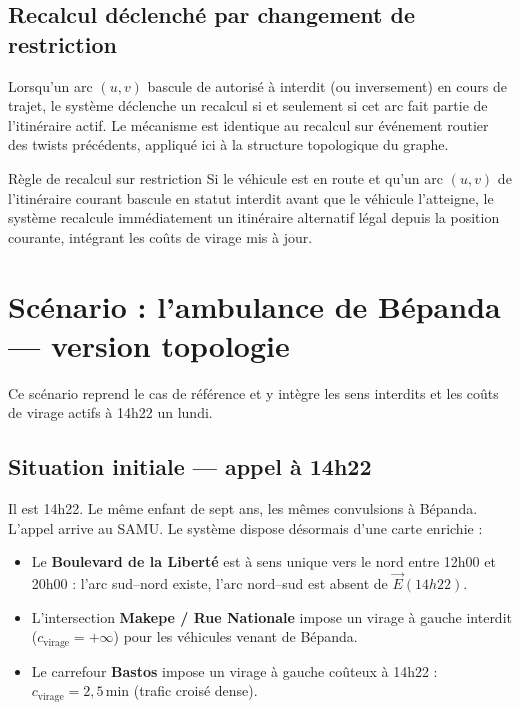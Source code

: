 \documentclass[12pt,a4paper]{article}
\theoremstyle{definition}
\theoremstyle{remark}
\begin{document}
\subsection{Recalcul déclenché par changement de restriction}

Lorsqu'un arc $(u, v)$ bascule de autorisé à interdit (ou inversement)
en cours de trajet, le système déclenche un recalcul si et seulement
si cet arc fait partie de l'itinéraire actif. Le mécanisme est identique
au recalcul sur événement routier des twists précédents, appliqué ici
à la structure topologique du graphe.

\begin{metierbox}{Règle de recalcul sur restriction}
Si le véhicule est en route et qu'un arc $(u, v)$ de l'itinéraire
courant bascule en statut interdit avant que le véhicule l'atteigne,
le système recalcule immédiatement un itinéraire alternatif légal
depuis la position courante, intégrant les coûts de virage mis à jour.
\end{metierbox}

\newpage

\section{Scénario : l'ambulance de Bépanda — version topologie}

Ce scénario reprend le cas de référence et y intègre les sens interdits
et les coûts de virage actifs à 14h22 un lundi.

\subsection{Situation initiale — appel à 14h22}

Il est 14h22. Le même enfant de sept ans, les mêmes convulsions à Bépanda.
L'appel arrive au SAMU. Le système dispose désormais d'une carte enrichie :

\begin{itemize}[leftmargin=2em, itemsep=4pt]
  \item Le \textbf{Boulevard de la Liberté} est à sens unique vers le
    nord entre 12h00 et 20h00 : l'arc sud–nord existe, l'arc
    nord–sud est absent de $\vec{E}(14h22)$.
  \item L'intersection \textbf{Makepe / Rue Nationale} impose un virage
    à gauche interdit ($c_\text{virage} = +\infty$) pour les véhicules
    venant de Bépanda.
  \item Le carrefour \textbf{Bastos} impose un virage à gauche coûteux
    à 14h22 : $c_\text{virage} = 2,5\,\text{min}$ (trafic croisé dense).
\end{itemize}
\end{document}
